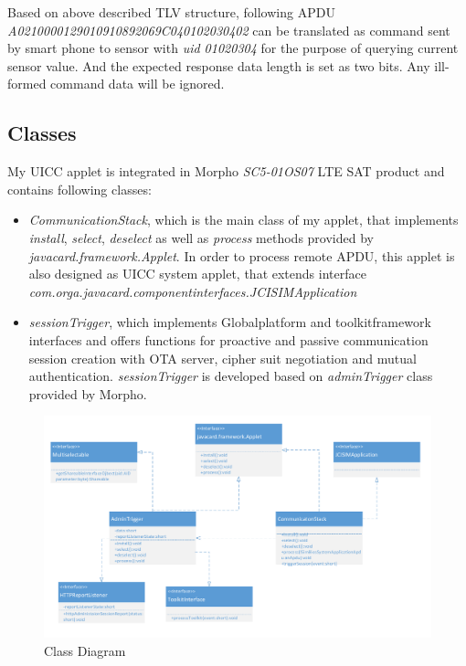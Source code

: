 Based on above described TLV structure, following APDU \emph{A0210000129010910892069C040102030402}\label{remote-apdu-example} can be translated as command sent by smart phone to sensor with \emph{uid 01020304} for the purpose of querying current sensor value. And the expected response data length is set as two bits. Any ill-formed command data will be ignored.

\subsection{Classes}\sloppy
My UICC applet is integrated in Morpho \emph{SC5-01OS07} LTE SAT product and contains following classes:
 \begin{itemize}
  \item  \emph{CommunicationStack}, which is the main class of my applet, that implements \emph{install}, \emph{select}, \emph{deselect} as well as \emph{process} methods provided by \emph{javacard.framework.Applet}. In order to process remote APDU, this applet is also designed as UICC system applet, that extends interface \emph{com.orga.javacard.componentinterfaces.JCISIMApplication}
  \item  \emph{sessionTrigger}, which implements Globalplatform  and toolkitframework interfaces and offers functions for proactive and passive communication session creation with OTA server, cipher suit negotiation and mutual authentication. \emph{sessionTrigger} is developed based on \emph{adminTrigger} class provided by Morpho.
\end{itemize}

\begin{figure}[!htbp]
	\centering
	\includegraphics[width=1.0\textwidth]{class}
		\caption{Class Diagram}
	\label{fig:class}
\end{figure}

